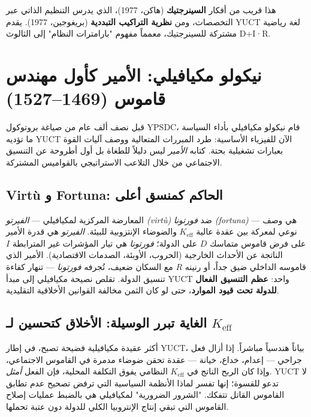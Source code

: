 \documentclass[12pt,a4paper]{article}
\begin{document}
	هذا قريب من أفكار \textbf{السينرجتيك} (هاكن، 1977)، الذي يدرس التنظيم الذاتي عبر التخصصات، ومن \textbf{نظرية التراكيب التبددية} (بريغوجين، 1977). يقدم YUCT لغة رياضية مشتركة للسينرجتيك، معمماً مفهوم "بارامترات النظام" إلى الثالوث D+I·R.
	
	\section{نيكولو مكيافيلي: الأمير كأول مهندس قاموس (1469–1527)}
	\label{sec:machiavelli}
	
	قبل نصف ألف عام من صياغة بروتوكول YPSDC، قام نيكولو مكيافيلي بأداء السياسة ما تؤديه YUCT الآن للفيزياء الأساسية: طرد المبررات المتعالية ووصف آليات القوة بعبارات تشغيلية بحتة. كتابه \emph{الأمير} ليس دليلاً للطغاة بل أول أطروحة عن التنسيق الاجتماعي من خلال التلاعب الاستراتيجي بالقواميس المشتركة.
	
	\subsection{Virtù و Fortuna: الحاكم كمنسق أعلى}
	
	المعارضة المركزية لمكيافيلي — \emph{الفيرتو (virtù)} ضد \emph{فورتونا (fortuna)} — هي وصف نوعي لمعركة بين عقدة عالية \(K_{\mathrm{eff}}\) والضوضاء الإنتزوبية للبيئة. \emph{الفيرتو} هي قدرة الأمير على فرض قاموس متماسك \(D\) على الدولة؛ \emph{فورتونا} هي تيار المؤشرات غير المترابطة \(I\) الناتجة عن الأحداث الخارجية (الحروب، الأوبئة، الصدمات الاقتصادية). الأمير الذي قاموسه الداخلي ضيق جداً، أو رنينه \(R\) مع السكان ضعيف، تُجرفه \emph{فورتونا} — تنهار كفاءة تنسيق الدولة. تقلص نصيحة مكيافيلي إلى مبدأ YUCT واحد: \textbf{عظم التنسيق الفعال للدولة تحت قيود الموارد}، حتى لو كان الثمن مخالفة القوانين الأخلاقية التقليدية.
	
	\subsection{الغاية تبرر الوسيلة: الأخلاق كتحسين لـ \(K_{\mathrm{eff}}\)}
	
	أكثر عقيدة مكيافيلية فضيحة تصبح، في إطار YUCT، بياناً هندسياً مباشراً. إذا أزال فعل جراحي — إعدام، خداع، خيانة — عقدة تحقن ضوضاء مدمرة في القاموس الاجتماعي، وإذا كان الربح الناتج في \(K_{\mathrm{eff}}\) النظامي يفوق التكلفة المحلية، فإن الفعل \emph{أمثل}. YUCT لا تدعو للقسوة؛ إنها تفسر لماذا الأنظمة السياسية التي ترفض تصحيح عدم تطابق القاموس القاتل تتفكك. "الشرور الضرورية" لمكيافيلي هي بالضبط عمليات إصلاح القاموس التي تبقي إنتاج الإنتروبيا الكلي للدولة دون عتبة تحملها.
	
\end{document}
